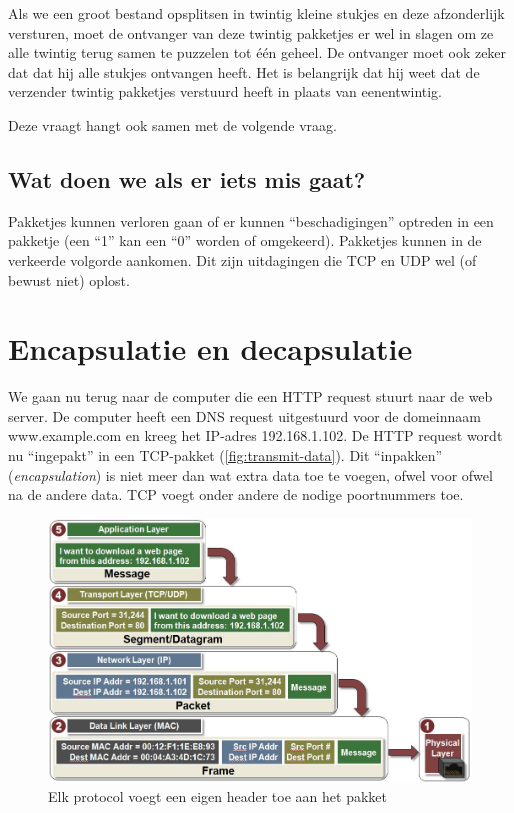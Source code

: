 Als we een groot bestand opsplitsen in twintig kleine stukjes en deze afzonderlijk versturen, moet de ontvanger van deze twintig pakketjes er wel in slagen om ze alle twintig terug samen te puzzelen tot één geheel.
De ontvanger moet ook zeker dat dat hij alle stukjes ontvangen heeft.
Het is belangrijk dat hij weet dat de verzender twintig pakketjes verstuurd heeft in plaats van eenentwintig.

Deze vraagt hangt ook samen met de volgende vraag.

\subsection{Wat doen we als er iets mis gaat?}
Pakketjes kunnen verloren gaan of er kunnen ``beschadigingen'' optreden in een pakketje (een ``1'' kan een ``0'' worden of omgekeerd).
Pakketjes kunnen in de verkeerde volgorde aankomen.
Dit zijn uitdagingen die TCP en UDP wel (of bewust niet) oplost.




\section{Encapsulatie en decapsulatie}

We gaan nu terug naar de computer die een HTTP request stuurt naar de web server.
De computer heeft een DNS request uitgestuurd voor de domeinnaam www.example.com en kreeg het IP-adres 192.168.1.102.
De HTTP request wordt nu ``ingepakt'' in een TCP-pakket (\vref{fig:transmit-data}).
Dit ``inpakken'' (\emph{encapsulation}) is niet meer dan wat extra data toe te voegen, ofwel voor ofwel na de andere data.
TCP voegt onder andere de nodige poortnummers toe.


\begin{figure}
   \centering
   \includegraphics[width=\textwidth]{images/transmit_data.jpg}
   \caption{Elk protocol voegt een eigen header toe aan het pakket}
   \label{fig:transmit-data}
\end{figure}

